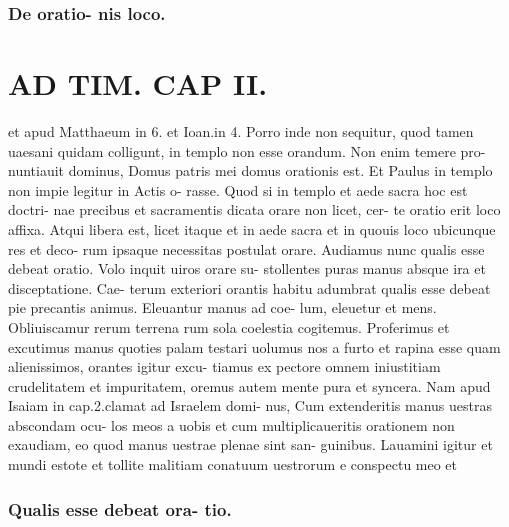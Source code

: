 \documentclass{article}
\begin{document}
\begin{pages}
\subsubsection*{De oratio- nis loco. }
\section*{AD TIM. CAP II. }
\marginpar{[ p.118 ]}\pstart et apud Matthaeum in 6. et Ioan.in 4. Porro inde non sequitur, quod tamen uaesani quidam colligunt, in templo non esse orandum. Non enim temere pro- nuntiauit dominus, Domus patris mei domus orationis est. Et Paulus in templo non impie legitur in Actis o- rasse. Quod si in templo et aede sacra hoc est doctri- nae precibus et sacramentis dicata orare non licet, cer- te oratio erit loco affixa. Atqui libera est, licet itaque et in aede sacra et in quouis loco ubicunque res et deco- rum ipsaque necessitas postulat orare. Audiamus nunc qualis esse debeat oratio. Volo inquit uiros orare su- stollentes puras manus absque ira et disceptatione. Cae- terum exteriori orantis habitu adumbrat qualis esse debeat pie precantis animus. Eleuantur manus ad coe- lum, eleuetur et mens. Obliuiscamur rerum terrena rum sola coelestia cogitemus. Proferimus et excutimus manus quoties palam testari uolumus nos a furto et rapina esse quam alienissimos, orantes igitur excu- tiamus ex pectore omnem iniustitiam crudelitatem et impuritatem, oremus autem mente pura et syncera. Nam apud Isaiam in cap.2.clamat ad Israelem domi- nus, Cum extenderitis manus uestras abscondam ocu- los meos a uobis et cum multiplicaueritis orationem non exaudiam, eo quod manus uestrae plenae sint san- guinibus. Lauamini igitur et mundi estote et tollite malitiam conatuum uestrorum e conspectu meo et  \pend
\subsubsection*{Qualis esse debeat ora- tio. }

\end{pages}
\end{document}
